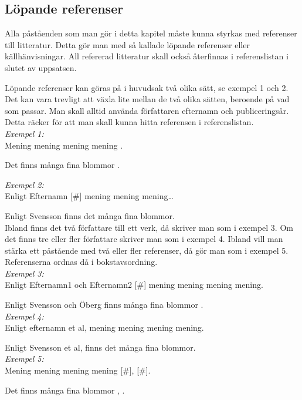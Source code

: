 \documentclass[a4paper,12pt]{article} %
\begin{document}
\subsection{Löpande referenser}
Alla påståenden som man gör i detta kapitel måste kunna styrkas med referenser till litteratur. Detta gör man med så kallade löpande referenser eller källhänvisningar. All refererad litteratur skall också återfinnas i referenslistan i slutet av uppsatsen.

Löpande referenser kan göras på i huvudsak två olika sätt, se exempel 1 och 2. Det kan vara trevligt att växla lite mellan de två olika sätten, beroende på vad som passar. Man skall alltid använda författaren efternamn och publiceringsår. Detta räcker för att man skall kunna hitta referensen i referenslistan.\\

{\em Exempel 1:}\\
Mening mening mening mening \cite{sven01}.

Det finns många fina blommor \cite{sven01}.

{\em Exempel 2:}\\
Enligt Efternamn [\#] mening mening mening…

Enligt Svensson \cite{sven01} finns det många fina blommor.\\

Ibland finns det två författare till ett verk, då skriver man som i exempel 3. Om det finns tre eller fler författare skriver man som i exempel 4. Ibland vill man stärka ett påstående med två eller fler referenser, då gör man som i exempel 5. Referenserna ordnas då i bokstavsordning. \\

{\em Exempel 3:}\\
Enligt Efternamn1 och Efternamn2 [\#] mening mening mening mening.

Enligt Svensson och Öberg finns många fina blommor \cite{sven02}.\\

{\em Exempel 4:}\\
Enligt efternamn et al, \cite{Creswell2014} mening mening mening mening.

Enligt Svensson et al, \cite{sven07} finns det många fina blommor.\\

{\em Exempel 5:}\\
Mening mening mening mening [\#], [\#].

Det finns många fina blommor \cite{sven01}, \cite{sven02}.\\
\end{document}
